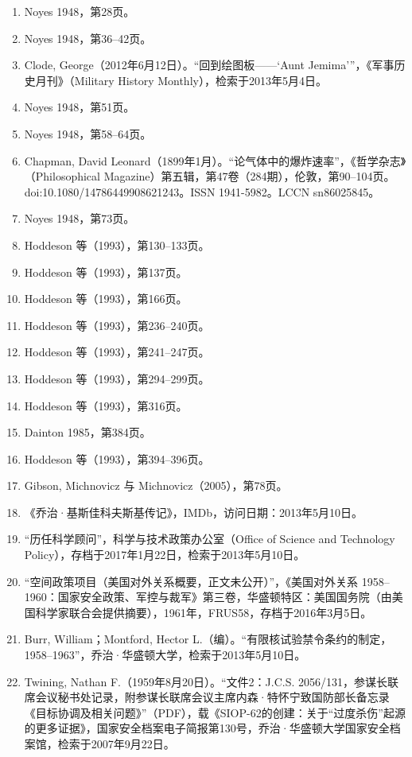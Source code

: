 \begin{enumerate}
\item Noyes 1948，第28页。
\item Noyes 1948，第36–42页。
\item Clode, George（2012年6月12日）。“回到绘图板——‘Aunt Jemima’”，《军事历史月刊》（Military History Monthly），检索于2013年5月4日。
\item Noyes 1948，第51页。
\item Noyes 1948，第58–64页。
\item Chapman, David Leonard（1899年1月）。“论气体中的爆炸速率”，《哲学杂志》（Philosophical Magazine）第五辑，第47卷（284期），伦敦，第90–104页。doi:10.1080/14786449908621243。ISSN 1941-5982。LCCN sn86025845。
\item Noyes 1948，第73页。
\item Hoddeson 等（1993），第130–133页。
\item Hoddeson 等（1993），第137页。
\item Hoddeson 等（1993），第166页。
\item Hoddeson 等（1993），第236–240页。
\item Hoddeson 等（1993），第241–247页。
\item Hoddeson 等（1993），第294–299页。
\item Hoddeson 等（1993），第316页。
\item Dainton 1985，第384页。
\item Hoddeson 等（1993），第394–396页。
\item Gibson, Michnovicz 与 Michnovicz（2005），第78页。
\item 《乔治·基斯佳科夫斯基传记》，IMDb，访问日期：2013年5月10日。
\item “历任科学顾问”，科学与技术政策办公室（Office of Science and Technology Policy），存档于2017年1月22日，检索于2013年5月10日。
\item “空间政策项目（美国对外关系概要，正文未公开）”，《美国对外关系 1958–1960：国家安全政策、军控与裁军》第三卷，华盛顿特区：美国国务院（由美国科学家联合会提供摘要），1961年，FRUS58，存档于2016年3月5日。
\item Burr, William；Montford, Hector L.（编）。“有限核试验禁令条约的制定，1958–1963”，乔治·华盛顿大学，检索于2013年5月10日。
\item Twining, Nathan F.（1959年8月20日）。“文件2：J.C.S. 2056/131，参谋长联席会议秘书处记录，附参谋长联席会议主席内森·特怀宁致国防部长备忘录《目标协调及相关问题》”（PDF），载《SIOP-62的创建：关于“过度杀伤”起源的更多证据》，国家安全档案电子简报第130号，乔治·华盛顿大学国家安全档案馆，检索于2007年9月22日。

\end{enumerate}
